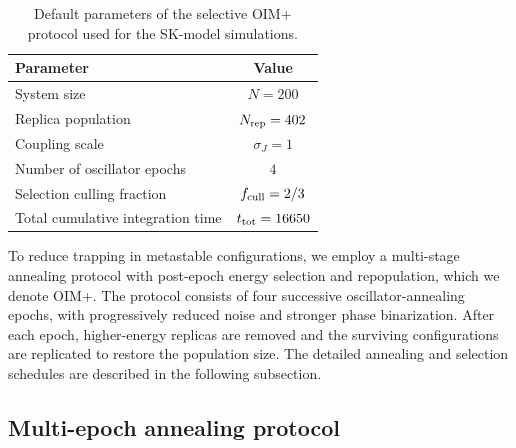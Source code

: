 \documentclass[
reprint,
amsmath,amssymb,
aps,
pre,
floatfix,
]{revtex4-2}
\begin{document}
\begin{table}[t]
\caption{Default parameters of the selective OIM+ protocol used for the
SK-model simulations.}
\label{tab:simulation_parameters}
\begin{ruledtabular}
\begin{tabular}{lc}
Parameter & Value \\
\hline
System size & $N=200$ \\
Replica population & $N_{\rm rep}=402$ \\
Coupling scale & $\sigma_J=1$ \\
Number of oscillator epochs & $4$ \\
Selection culling fraction & $f_{\rm cull}=2/3$ \\
Total cumulative integration time & $t_{\rm tot}=16650$ \\
\end{tabular}
\end{ruledtabular}
\end{table}


To reduce trapping in metastable configurations, we employ a multi-stage
annealing protocol with post-epoch energy selection and repopulation,
which we denote OIM+. The protocol consists of four successive
oscillator-annealing epochs, with progressively reduced noise and stronger
phase binarization. After each epoch, higher-energy replicas are removed
and the surviving configurations are replicated to restore the population
size. The detailed annealing and selection schedules are described in the
following subsection.

\subsection{Multi-epoch annealing protocol}
\label{sec:anneal}
\end{document}
